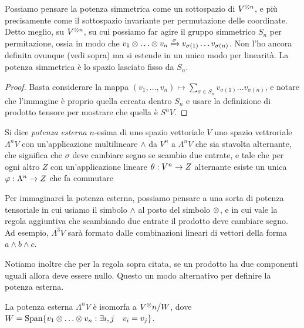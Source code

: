   \begin{myobs}
   Possiamo pensare la potenza simmetrica come un sottospazio di $V^{\otimes n}$, e più precisamente come il sottospazio invariante per permutazione delle coordinate. Detto meglio, su $V^{\otimes n}$, su cui possiamo far agire il gruppo simmetrico $S_n$ per permitazione, ossia in modo che $v_1 \tensor \dots \tensor v_n \xmapsto{\sigma} v_{\sigma(1)} \dots v_{\sigma(n)}$. Non l'ho ancora definita ovunque (vedi sopra) ma si estende in un unico modo per linearità. La potenza simmetrica è lo spazio lasciato fisso da $S_n$.
  \end{myobs}

  \begin{proof}
   Basta considerare la mappa $(v_1,\dots,v_n) \mapsto \sum_{\sigma \in S_n} v_{\sigma(1)} \dots v_{\sigma(n)}$, e notare che l'immagine è proprio quella cercata dentro $S_n$ e usare la definizione di prodotto tensore per mostrare che quella è $S^nV$.
  \end{proof}
  
  \begin{mydef}
   Si dice \emph{potenza esterna} $n$-esima di uno spazio vettoriale $V$ uno spazio vettroriale $\Lambda^nV$ con un'applicazione multilineare $\wedge$ da $V^n$ a $\Lambda^nV$ che sia stavolta alternante, che significa che $\sigma$ deve cambiare segno se scambio due entrate, e tale che per ogni altro $Z$ con un'applicazione lineare $\theta: V^n \rightarrow Z$ alternante esiste un unica $\varphi: \Lambda^n \rightarrow Z$ che fa commutare 
   
  
  \end{mydef}
    
  \begin{myobs}
   Per immaginarci la potenza esterna, possiamo pensare a una sorta di potenza tensoriale in cui usiamo il simbolo $\wedge$ al posto del simbolo $\otimes$, e in cui vale la regola aggiuntiva che scambiando due entrate il prodotto deve cambiare segno. Ad esempio, $\Lambda^3V$ sarà formato dalle combinazioni lineari di vettori della forma $a\wedge b \wedge c$. 
   
   Notiamo inoltre che per la regola sopra citata, se un prodotto ha due componenti uguali allora deve essere nullo. Questo  un modo alternativo per definire la potenza esterna.
  \end{myobs}
  
  \begin{myprop}
   La potenza esterna $\Lambda^nV$ è isomorfa a $V^\otimes n/W$, dove $W=\Span\{v_1 \tensor \dots \tensor v_n: \exists i,j\quad v_i=v_j\}$.
  \end{myprop}
